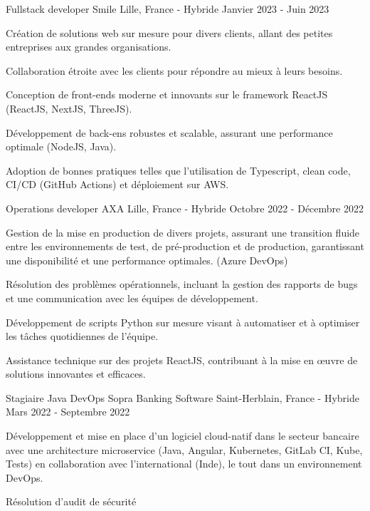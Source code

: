 \begin{cventries}
  \cventry
    {Fullstack developer} %
    {Smile} %
    {Lille, France - Hybride} %
    {Janvier 2023 - Juin 2023} %
    {
      \begin{cvitems} %
        \item {Création de solutions web sur mesure pour divers clients, allant des petites entreprises aux grandes organisations.}
        \item {Collaboration étroite avec les clients pour répondre au mieux à leurs besoins.}
        \item {Conception de front-ends moderne et innovants sur le framework ReactJS (ReactJS, NextJS, ThreeJS).}
        \item {Développement de back-ens robustes et scalable, assurant une performance optimale (NodeJS, Java).}
        \item {Adoption de bonnes pratiques telles que l'utilisation de Typescript, clean code, CI/CD (GitHub Actions) et déploiement sur AWS.}
      \end{cvitems}
    }

  \cventry
    {Operations developer} %
    {AXA} %
    {Lille, France - Hybride} %
    {Octobre 2022 - Décembre 2022} %
    {
      \begin{cvitems} %
        \item {Gestion de la mise en production de divers projets, assurant une transition fluide entre les environnements de test, de pré-production et de production, garantissant une disponibilité et une performance optimales. (Azure DevOps)}
        \item {Résolution des problèmes opérationnels, incluant la gestion des rapports de bugs et une communication avec les équipes de développement.}
        \item {Développement de scripts Python sur mesure visant à automatiser et à optimiser les tâches quotidiennes de l'équipe.}
        \item {Assistance technique sur des projets ReactJS, contribuant à la mise en œuvre de solutions innovantes et efficaces.}
      \end{cvitems}
    }

  \cventry
    {Stagiaire Java DevOps} %
    {Sopra Banking Software} %
    {Saint-Herblain, France - Hybride} %
    {Mars 2022 - Septembre 2022} %
    {
      \begin{cvitems} %
        \item {Développement et mise en place d'un logiciel cloud-natif dans le secteur bancaire avec une architecture microservice (Java, Angular, Kubernetes, GitLab CI, Kube, Tests) en collaboration avec l'international (Inde), le tout dans un environnement DevOps.}
        \item {Résolution d'audit de sécurité}
      \end{cvitems}
    }
    

\end{cventries}
